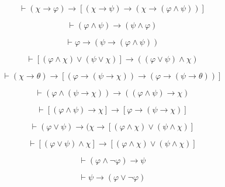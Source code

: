 \documentclass{minimal}
\begin{document}
\begin{equation}
  \vdash(\chi\to\varphi)\to[(\chi\to\psi)\to(\chi\to(\varphi\wedge\psi))]
\end{equation}

\begin{equation}
  \vdash(\varphi\wedge\psi)\to(\psi\wedge\varphi)
\end{equation}

\begin{equation}
  \vdash\varphi\to(\psi\to(\varphi\wedge\psi))
\end{equation}

\begin{equation}
  \vdash[(\varphi\wedge\chi)\vee(\psi\vee\chi)]\to((\varphi\vee\psi)\wedge\chi)
\end{equation}

\begin{equation}
  \vdash(\chi\to\theta)\to[(\varphi\to(\psi\to\chi))\to(\varphi\to(\psi\to\theta))]
\end{equation}

\begin{equation}
  \vdash(\varphi\wedge(\psi\to\chi))\to((\varphi\wedge\psi)\to\chi)
\end{equation}

\begin{equation}
  \vdash[(\varphi\wedge\psi)\to\chi]\to[\varphi\to(\psi\to\chi)]
\end{equation}

\begin{equation}
  \vdash(\varphi\vee\psi)\to(\chi\to[(\varphi\wedge\chi)\vee(\psi\wedge\chi)]
\end{equation}

\begin{equation}
  \vdash[(\varphi\vee\psi)\wedge\chi]\to[(\varphi\wedge\chi)\vee(\psi\wedge\chi)]
\end{equation}

\begin{equation}
  \vdash(\varphi\wedge\neg\varphi)\to\psi
\end{equation}

\begin{equation}
  \vdash\psi\to(\varphi\vee\neg\varphi)
\end{equation}
\end{document}
